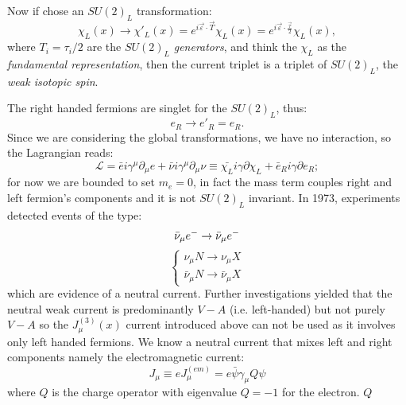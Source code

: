 Now if chose an $SU(2)_L$ transformation:
\begin{equation}
  \chi_L (x) \to \chi'_L (x) = e^{i \vec{\varepsilon} \cdotp \vec{T}} \chi_L(x)
  = e^{i \vec{\varepsilon} \cdotp \frac{\vec{\tau}}{2}} \chi_L(x),
\end{equation}
where $T_i = \tau_i / 2$ are the $SU(2)_L$ \emph{generators}, and think the
$\chi_L$ as the \emph{fundamental representation}, then the current triplet is a
triplet of $SU(2)_L$, the \emph{weak isotopic spin}.

The right handed fermions are singlet for the $SU(2)_{L}$, thus:
\begin{equation}
  e_{R} \to e'_{R}= e_{R}.
\end{equation}
Since we are considering the global transformations, we have no interaction, so
the Lagrangian reads:
\begin{equation}
  \label{eq:2}
  \mathcal{L} = \bar{e} i \gamma^{\mu} \partial_{\mu} e + \bar{\nu} i
  \gamma^{\mu} \partial_{\mu} \nu \equiv \bar{\chi_{L}} i
  \gamma \partial \chi_{L} + \bar{e}_{R} i \gamma \partial e_{R};
\end{equation}
for now we are bounded to set $m_{e} = 0$, in fact the mass term couples right
and left fermion's components and it is not $SU(2)_{L}$ invariant.  In 1973,
experiments detected events of the type:
\begin{equation}
  \label{eq:3}
  \bar{\nu}_{\mu}e^{-} \rightarrow \bar{\nu}_{\mu}e^{-} \\
\end{equation}
\begin{equation}
  \label{eq:4}
  \begin{cases}
    \nu_{\mu} N \rightarrow \nu_{\mu} X \\
    \bar{\nu}_{\mu} N \rightarrow \bar{\nu}_{\mu} X
  \end{cases}
\end{equation}
which are evidence of a neutral current. Further investigations yielded that the
neutral weak current is predominantly $V-A$ (i.e. left-handed) but not purely
$V-A$ so the $J^{(3)}_{\mu}(x)$ current introduced above can not be used as it
involves only left handed fermions.  We know a neutral current that mixes left
and right components namely the electromagnetic current:
\begin{equation}
  \label{eq:5}
  J_{\mu} \equiv e J_{\mu}^{(em)} = e \bar{\psi} \gamma_{\mu} Q \psi
\end{equation}
where $Q$ is the charge operator with eigenvalue $Q = -1$ for the electron. $Q$
